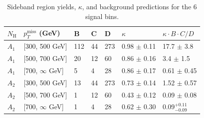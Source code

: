 \begin{table}[hbp!]
\centering
\caption{
Sideband region yields, $\kappa$, and background predictions for the 6 signal bins.
}
\begin{tabular}{lllllll}
\hline
\hline
$N_{\mathrm{H}}$ & $p_{T}^{\mathrm{miss}}$ (GeV) & B & C & D & $\kappa$  & $\kappa \cdot B \cdot C / D$ \\
\hline
$A_{1}$ & [300, 500 GeV]      & 112 & 44  & 273 & 0.98 $\pm$ 0.11 & 17.7 $\pm$ 3.8\\
$A_{1}$ & [500, 700 GeV]      & 20   & 12  & 60   & 0.86 $\pm$ 0.16 & 3.4  $\pm$ 1.5\\
$A_{1}$ & [700, $\infty$ GeV] & 5    & 4    & 28   & 0.86 $\pm$ 0.17 & 0.61 $\pm$ 0.45\\
$A_{2}$ & [300, 500 GeV]      & 13   & 44  & 273 & 0.73 $\pm$ 0.14 & 1.52 $\pm$ 0.57\\
$A_{2}$ & [500, 700 GeV]      & 1     & 12  & 60   & 0.43 $\pm$ 0.12 & 0.09 $\pm$ 0.08\\
$A_{2}$ & [700, $\infty$ GeV] & 1     & 4     & 28   & 0.62 $\pm$ 0.30 & 0.09$^{+0.11}_{-0.09}$\\
\hline
\hline
\end{tabular}
\label{tab:tab}
\end{table}

